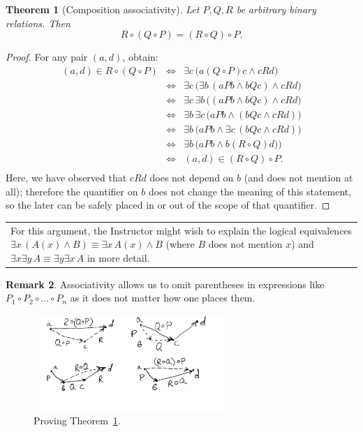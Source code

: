 \documentclass[12pt,notitlepage]{article}
\theoremstyle{plain}
\newtheorem{thm}{Theorem}[section]
\theoremstyle{definition}
\newtheorem{rem}[thm]{Remark}
\theoremstyle{plain}
\newcommand{\1}{\mathbf{1}}
\newcommand{\0}{\mathbf{0}}
\newcommand{\mcomm}[1]{
\medskip\noindent\begin{tabular}{| l}
\parbox{0.99\textwidth}{{\small
#1 }}\end{tabular}
\smallskip}
\begin{document}
\begin{thm}[Composition associativity]\label{ch0:rel_comp}
Let $P, Q, R$ be arbitrary binary relations. Then
$$R \circ (Q \circ P) = (R \circ Q) \circ P.$$
\end{thm}
\begin{proof} For any pair $(a,d)$, obtain:
$$
\begin{array}{rcl}
(a, d) \in R \circ (Q \circ P) &\iff& \exists c\, \bigl( a(Q \circ P)c \wedge cRd \bigr)\\
&\iff&\exists c\, \bigl( \exists b\, ( aPb \wedge bQc ) \wedge cRd \bigr)\\
&\iff& \exists c\, \exists b\, \bigl(  (aPb \wedge bQc)  \wedge cRd \bigr)\\
&\iff& \exists b\, \exists c\, \bigl(  aPb \wedge (bQc  \wedge cRd) \bigr)\\
&\iff&\exists b\, \bigl( aPb \wedge \exists c\, (bQc  \wedge cRd ) \bigr)\\
&\iff&\exists b\, \bigl( aPb \wedge b(R \circ Q)d ) \bigr)\\
&\iff& (a,d) \in (R \circ Q)\circ P.\\
\end{array}
$$
Here, we have observed that $c R d$ does not depend on $b$ (and does not mention at all); therefore the quantifier on $b$ does not change the meaning of this statement, so the later can be safely placed in or out of the scope of that quantifier.

\end{proof}
\mcomm{For this argument, the Instructor might wish to explain the logical equivalences $\exists x\, (A(x) \wedge B) \equiv \exists x\, A(x) \wedge B$ (where $B$ does not mention $x$) and $\exists x \exists y\, A \equiv \exists y \exists x\, A$ in more detail.}
\begin{rem}
Associativity allows us to omit parentheses in expressions like $P_1 \circ P_2 \circ \ldots \circ P_n$ as it does not matter how one places them.
\end{rem}

\begin{figure}[h]
\centering
\includegraphics*[width=0.65\textwidth]{comp_assoc.pdf}
\caption{Proving Theorem~\ref{ch0:rel_comp}.}
\end{figure}
\end{document}
